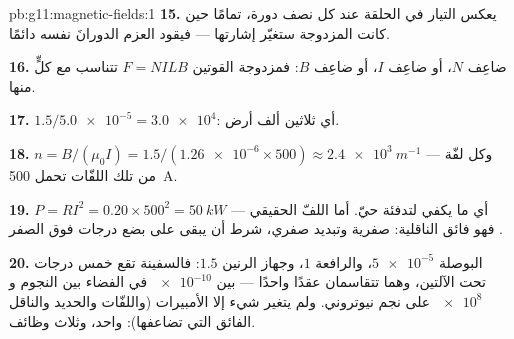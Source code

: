 \begin{solution}{pb:g11:magnetic-fields:1}
\textbf{15.} يعكس التيار في الحلقة عند كل نصف دورة،
تمامًا حين كانت المزدوجة ستغيّر إشارتها --- فيقود العزم
الدورانَ نفسه دائمًا.

\textbf{16.} ضاعِف $N$، أو ضاعِف $I$، أو ضاعِف $B$: فمزدوجة القوتين
$F = NILB$ تتناسب مع كلٍّ منها.

\textbf{17.} $1.5 / \num{5.0e-5} = \num{3.0e4}$: أي ثلاثين ألف
أرض.

\textbf{18.} $n = B/(\mu_0 I) = 1.5 / (\num{1.26e-6} \times 500)
\approx \qty{2.4e3}{m^{-1}}$ --- وكل لفّة من تلك اللفّات تحمل
\qty{500}{A}.

\textbf{19.} $P = RI^2 = 0.20 \times 500^2 = \qty{50}{kW}$ --- أي ما
يكفي لتدفئة حيّ. أما اللفّ الحقيقي فهو
فائق الناقلية:  صفرية وتبديد صفري، شرط أن
يبقى على بضع درجات فوق الصفر .

\textbf{20.} البوصلة $\num{5e-5}$، والرافعة $1$، وجهاز الرنين $1.5$: فالسفينة
تقع خمس درجات تحت الآلتين، وهما تتقاسمان عقدًا واحدًا ---
بين $\num{e-10}$ في الفضاء بين النجوم و$\num{e8}$ على نجم نيوتروني. ولم يتغير
شيء إلا الأمبيرات (واللفّات والحديد والناقل الفائق التي
تضاعفها):  واحد، وثلاث وظائف.
\end{solution}
